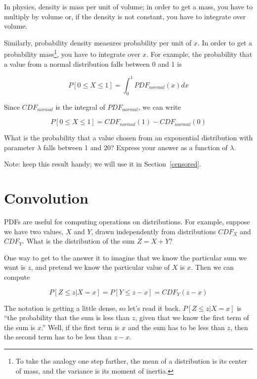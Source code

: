 \documentclass[12pt]{book}
\begin{document}
In physics, density is mass per unit of
volume; in order to get a mass, you have to multiply by volume or,
if the density is not constant, you have to integrate over volume.

Similarly, probability density measures probability per unit of $x$.
In order to get a probability mass\footnote{To take the analogy one
step farther, the mean of a distribution is its center of mass, and
the variance is its moment of inertia.}, you have to integrate over $x$.
For example, the probability that a value from a normal distribution
falls between 0 and 1 is

\[ P[0 \le X \le 1] = \int_0^1 PDF_{normal}(x) dx \]

Since $CDF_{normal}$ is the integral of $PDF_{normal}$, we can write

\[ P[0 \le X \le 1] = CDF_{normal}(1) - CDF_{normal}(0) \]


\begin{ex}
\label{expo_pdf}

What is the probability that a value chosen from an exponential
distribution with parameter $\lambda$ falls between 1 and 20?
Express your answer as a function of $\lambda$.

Note: keep this result handy; we will use it in
Section~\ref{censored}.

\end{ex}


\section{Convolution}

PDFs are useful for computing operations on distributions.  For
example, suppose we have two values, $X$ and $Y$, drawn independently
from distributions $CDF_X$ and $CDF_Y$.  What is the distribution of
the sum $Z = X + Y$?

One way to get to the answer it to imagine that we know the particular
sum we want is $z$, and pretend we know the particular value of $X$ is
$x$.  Then we can compute

\[ P[Z \le z | X = x] = P[Y \le z-x] = CDF_Y(z-x) \]

The notation is getting a little dense, so let's read it back.  
$P[Z \le z | X = x]$ is ``the probability that the sum is less than
$z$, given that we know the first term of the sum is $x$.''  Well, if
the first term is $x$ and the sum has to be less than $z$, then the
second term has to be less than $z-x$.
\end{document}
